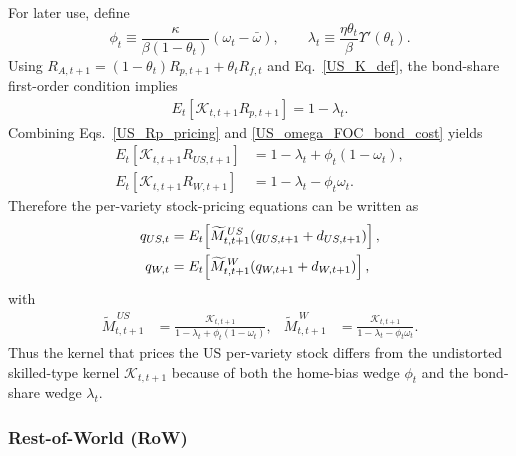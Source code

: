 \documentclass{article}
\begin{document}
For later use, define
\[
\phi_t
\equiv
\frac{\kappa}{\beta(1-\theta_t)}(\omega_t-\bar\omega),
\qquad
\lambda_t
\equiv
\frac{\eta\theta_t}{\beta}\Upsilon'(\theta_t).
\]
Using $R_{A,t+1}=(1-\theta_t)R_{p,t+1}+\theta_tR_{f,t}$ and Eq.~\eqref{US_K_def}, the bond-share first-order condition implies
\begin{align}\label{US_Rp_pricing}
E_t\!\left[\mathcal K_{t,t+1}R_{p,t+1}\right]
=
1-\lambda_t.
\end{align}
Combining Eqs.~\eqref{US_Rp_pricing} and \eqref{US_omega_FOC_bond_cost} yields
\begin{align}
E_t\!\left[\mathcal K_{t,t+1}R_{US,t+1}\right]
&=
1-\lambda_t+\phi_t(1-\omega_t),\label{US_RUS_pricing}\\
E_t\!\left[\mathcal K_{t,t+1}R_{W,t+1}\right]
&=
1-\lambda_t-\phi_t\omega_t.\label{US_RW_pricing}
\end{align}
Therefore the per-variety stock-pricing equations can be written as
\begin{align}
q_{US,t}
&=
E_t\!\left[\widetilde M^{\,US}_{t,t+1}(q_{US,t+1}+d_{US,t+1})\right],\label{US_AP_bond_cost}\\
q_{W,t}
&=
E_t\!\left[\widetilde M^{\,W}_{t,t+1}(q_{W,t+1}+d_{W,t+1})\right],\notag
\end{align}
with
\begin{align*}
\widetilde M^{\,US}_{t,t+1}
&=
\frac{\mathcal K_{t,t+1}}
{1-\lambda_t+\phi_t(1-\omega_t)},
&
\widetilde M^{\,W}_{t,t+1}
&=
\frac{\mathcal K_{t,t+1}}
{1-\lambda_t-\phi_t\omega_t}.
\end{align*}
Thus the kernel that prices the US per-variety stock differs from the undistorted skilled-type kernel $\mathcal K_{t,t+1}$ because of both the home-bias wedge $\phi_t$ and the bond-share wedge $\lambda_t$.

\subsubsection{Rest-of-World (RoW)}
\end{document}
